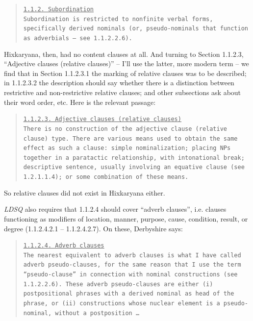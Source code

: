 \documentclass[output=paper,colorlinks,citecolor=brown
]{langscibook}
\begin{document}
\begin{quote}
\small
\underline{\underline{\texttt{1.1.2. Subordination}}}\\[0.5ex]
\texttt{Subordination is restricted to nonfinite verbal forms,
specifically derived nominals (or, pseudo-nominals that function
as adverbials – see 1.1.2.2.6).}
\end{quote}

\noindent
Hixkaryana, then, had no content clauses at all. And turning to
Section 1.1.2.3, ``Adjective clauses (relative clauses)'' -- I'll
use the latter, more modern term -- we find that in Section
1.1.2.3.1 the marking of relative clauses was to be described;
in 1.1.2.3.2 the description should say whether there is a
distinction between restrictive and non-restrictive relative clauses;
and other subsections ask about their word order, etc. Here is
the relevant passage:

\begin{quote}
\small
\underline{\underline{\texttt{1.1.2.3. Adjective clauses
(relative clauses)}}}\\[0.5ex]
\texttt{There is no construction of the adjective clause (relative
clause) type. There are various means used to obtain the same effect
as such a clause: simple nominalization; placing NPs together in a
paratactic relationship, with intonational break; descriptive
sentence, usually involving an equative clause (see 1.2.1.1.4);
or some combination of these means.}
\end{quote}

\noindent
So relative clauses did not exist in Hixkaryana either.

\textit{LDSQ} also requires that 1.1.2.4 should cover ``adverb clauses'',
i.e.  clauses functioning as modifiers of location, manner, purpose,
cause, condition, result, or degree (1.1.2.4.2.1 -- 1.1.2.4.2.7).
On these, Derbyshire says:

\begin{quote}
\small
\underline{\underline{\texttt{1.1.2.4. Adverb clauses}}}\\[0.5ex]
\texttt{The nearest equivalent to adverb clauses is what I have
called adverb pseudo-clauses, for the same reason that I use
the term ``pseudo-clause'' in connection with nominal constructions
(see 1.1.2.2.6). These adverb pseudo-clauses are either (i)
postpositional phrases with a derived nominal as head of
the phrase, or (ii) constructions whose nuclear element is a
pseudo-nominal, without a postposition \ldots }
\end{quote}
\end{document}

